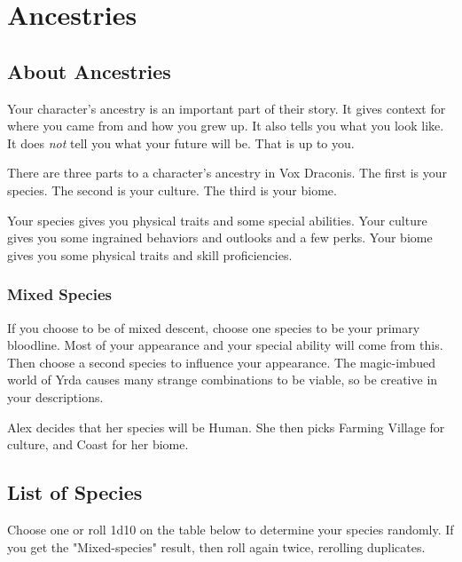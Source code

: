 \chapter{Ancestries}

\begin{multicols}{2}

\section{About Ancestries}

Your character's ancestry is an important part of their story. It gives
context for where you came from and how you grew up. It also tells you
what you look like. It does \textit{not} tell you what your future will
be. That is up to you.

There are three parts to a character's ancestry in Vox Draconis. The first
is your species. The second is your culture. The third is your biome.

Your species gives you physical traits and some special abilities. Your
culture gives you some ingrained behaviors and outlooks and a few perks. Your biome gives
you some physical traits and skill proficiencies.

\subsection{Mixed Species}

If you choose to be of mixed descent, choose one species to be your primary
bloodline. Most of your appearance and your special ability will come from this. Then
choose a second species to influence your appearance. The magic-imbued world
of Yrda causes many strange combinations to be viable, so be creative in your
descriptions.

\begin{displayquote}
Alex decides that her species will be Human. She then picks Farming Village
for culture, and Coast for her biome.
\end{displayquote}

\section{List of Species}

Choose one or roll 1d10 on the table below to determine your species randomly.
If you get the "Mixed-species" result, then roll again twice, rerolling duplicates.


\end{multicols}
